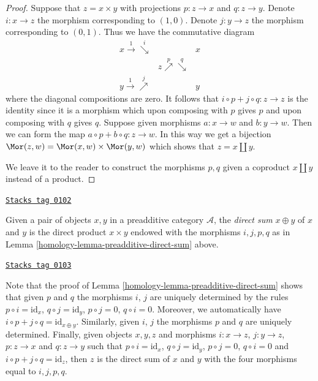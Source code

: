 \begin{proof}
Suppose that $z = x \times y$ with projections
$p : z \to x$ and $q : z \to y$. Denote $i : x \to z$
the morphism corresponding to $(1, 0)$. Denote $j : y \to z$
the morphism corresponding to $(0, 1)$. Thus we have the
commutative diagram
$$
\begin{array}{ccc}x \overset{1}{\longrightarrow}\overset{i}{\searrow} &  & x \\  & z \overset{p}{\nearrow}\overset{q}{\searrow} &  \\ y \overset{1}{\longrightarrow}\overset{j}{\nearrow} &  & y\end{array}
$$
where the diagonal compositions are zero. It follows that
$i \circ p + j \circ q : z \to z$ is the identity since
it is a morphism which upon composing with $p$ gives $p$
and upon composing with $q$ gives $q$.
Suppose given morphisms $a : x \to w$ and $b : y \to w$.
Then we can form the map $a \circ p + b \circ q : z \to w$.
In this way we get a bijection $\Mor(z, w)
= \Mor(x, w) \times \Mor(y, w)$ which
shows that $z = x \amalg y$.

\medskip\noindent
We leave it to the reader to construct the morphisms
$p, q$ given a coproduct $x \amalg y$ instead of a
product.
\end{proof}

\begin{definition}
\label{homology-definition-direct-sum}
\href{https://stacks.math.columbia.edu/tag/0102}{\texttt{Stacks tag 0102}}

Given a pair of objects $x, y$ in a preadditive category $\mathcal{A}$,
the {\it direct sum} $x \oplus y$ of $x$ and $y$ is the direct
product $x \times y$ endowed with the morphisms
$i, j, p, q$ as in Lemma \ref{homology-lemma-preadditive-direct-sum} above.
\end{definition}

\begin{remark}
\label{homology-remark-direct-sum}
\href{https://stacks.math.columbia.edu/tag/0103}{\texttt{Stacks tag 0103}}

Note that the proof of Lemma \ref{homology-lemma-preadditive-direct-sum}
shows that given $p$ and $q$ the morphisms $i$, $j$ are uniquely
determined by the rules $p \circ i = \text{id}_x$,
$q \circ j = \text{id}_y$, $p \circ j = 0$, $q \circ i = 0$.
Moreover, we automatically have
$i \circ p + j \circ q = \text{id}_{x \oplus y}$.
Similarly, given $i$, $j$ the morphisms $p$ and $q$ are uniquely determined.
Finally, given objects $x, y, z$ and morphisms
$i : x \to z$, $j : y \to z$, $p : z \to x$ and
$q : z \to y$ such that $p \circ i = \text{id}_x$,
$q \circ j = \text{id}_y$, $p \circ j = 0$, $q \circ i = 0$
and $i \circ p + j \circ q = \text{id}_z$, then $z$
is the direct sum of $x$ and $y$ with the four morphisms
equal to $i, j, p, q$.
\end{remark}


